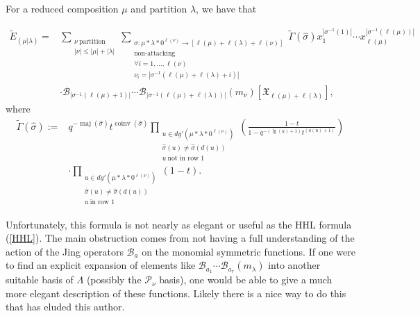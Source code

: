 \documentclass[ALCO,Unicode]{cedram}
\DeclareMathOperator{\maj}{maj}
\DeclareMathOperator{\coinv}{coinv}
\DeclareMathOperator{\mathleg}{lg}
\begin{document}
\begin{coro}\label{formula for stable macdonald}
    For a reduced composition $\mu$ and partition $\lambda$, we have that
    
    \begin{align*}
        \widetilde{E}_{(\mu|\lambda)} = &\sum_{\substack{\nu ~ \text{partition}  \\ |\nu| \leq |\mu|+|\lambda|}} \sum_{\substack{\sigma:\mu*\lambda * 0^{\ell(\nu)} \rightarrow [\ell(\mu)+\ell(\lambda)+\ell(\nu)]\\ \text{non-attacking} \\ \forall i = 1,\ldots,\ell(\nu) \\ \nu_i = |\sigma^{-1}(\ell(\mu)+\ell(\lambda)+i)|}}\widetilde{\Gamma}(\widehat{\sigma}) x_1 ^{|\sigma^{-1}(1)|}\cdots x_{\ell(\mu)} ^{|\sigma^{-1}(\ell(\mu))|} ~ \\
       & \cdot \mathscr{B}_{|\sigma^{-1}(\ell(\mu)+1)|}\cdots \mathscr{B}_{|\sigma^{-1}(\ell(\mu)+\ell(\lambda))|}( m_{\nu})[\mathfrak{X}_{\ell(\mu)+ \ell(\lambda)}],
    \end{align*} 
where 
\begin{align*}
\widetilde{\Gamma}(\widehat{\sigma}) := {} &q^{-\maj(\widehat{\sigma})}t^{\coinv(\widehat{\sigma})} \prod_{\substack{ u \in dg'(\mu*\lambda * 0^{\ell(\nu)}) \\ \widehat{\sigma}(u) \neq \widehat{\sigma}(d(u)) \\ u ~ \text{not in row } 1 }} \left( \frac{1-t}{1-q^{-(\mathleg(u)+1)}t^{(a(u)+1)}} \right) \\
& \cdot \prod_{\substack{ u \in dg'(\mu * \lambda * 0^{\ell(\nu)}) \\ \widehat{\sigma}(u) \neq \widehat{\sigma}(d(u)) \\ u ~ \text{in row } 1 }} \left( 1-t \right) .
\end{align*}
\end{coro}

Unfortunately, this formula is not nearly as elegant or useful as the HHL formula (\ref{HHL}). The main obstruction comes from not having a full understanding of the action of the Jing operators $\mathscr{B}_a$ on the monomial symmetric functions. If one were to find an explicit expansion of elements like $\mathscr{B}_{a_1}\cdots \mathscr{B}_{a_r}(m_{\lambda})$ into another suitable basis of $\Lambda$ (possibly the $\mathcal{P}_{\nu}$ basis), one would be able to give a much more elegant description of these functions. Likely there is a nice way to do this that has eluded this author.
\end{document}
